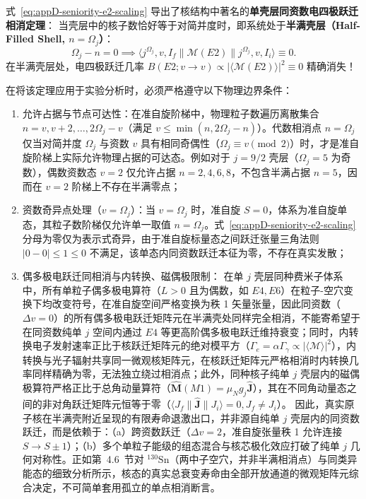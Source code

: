 式~\eqref{eq:appD-seniority-e2-scaling} 导出了核结构中著名的\textbf{单壳层同资数电四极跃迁相消定理}：
当壳层中的核子数恰好等于对简并度时，即系统处于\textbf{半满壳层（Half-Filled Shell, $n = \Omega_j$）}：
\begin{equation}\label{eq:appD-cancellation-theorem}
\Omega_j - n = 0 \implies \langle j^{\Omega_j}, v, I_f \| \mathcal{M}(E2) \| j^{\Omega_j}, v, I_i \rangle \equiv 0.
\end{equation}
在半满壳层处，电四极跃迁几率 $B(E2; v \to v) \propto |\langle \mathcal{M}(E2) \rangle|^2 \equiv 0$ 精确消失！

在将该定理应用于实验分析时，必须严格遵守以下物理边界条件：
\begin{enumerate}
\item 允许占据与节点可达性：在准自旋阶梯中，物理粒子数遍历离散集合 $n = v, v + 2, \dots, 2\Omega_j - v$（满足 $v \le \min(n, 2\Omega_j - n)$）。代数相消点 $n = \Omega_j$ 仅当对简并度 $\Omega_j$ 与资数 $v$ 具有相同奇偶性（$\Omega_j \equiv v \pmod 2$）时，才是准自旋阶梯上实际允许物理占据的可达态。例如对于 $j=9/2$ 壳层（$\Omega_j = 5$ 为奇数），偶数资数态 $v=2$ 仅允许占据 $n = 2, 4, 6, 8$，不包含半满占据 $n=5$，因而在 $v=2$ 阶梯上不存在半满零点；
\item 资数奇异点处理（$v = \Omega_j$）：当 $v = \Omega_j$ 时，准自旋 $S = 0$，体系为准自旋单态，其粒子数阶梯仅允许单一取值 $n = \Omega_j$。式~\eqref{eq:appD-seniority-e2-scaling} 分母为零仅为表示式奇异，由于准自旋标量态之间跃迁张量三角法则 $|0 - 0| \le 1 \le 0$ 不满足，该单态内同资数跃迁本征为零，不存在真实发散；
\item 偶多极电跃迁同相消与内转换、磁偶极限制：
在单 $j$ 壳层同种费米子体系中，所有单粒子偶多极电算符（$L > 0$ 且为偶数，如 $E4, E6$）在粒子-空穴变换下均改变符号，在准自旋空间严格变换为秩 1 矢量张量，因此同资数（$\Delta v = 0$）的所有偶多极电跃迁矩阵元在半满壳处同样完全相消，不能寄希望于在同资数纯单 $j$ 空间内通过 $E4$ 等更高阶偶多极电跃迁维持衰变；同时，内转换电子发射速率正比于核跃迁矩阵元的绝对模平方（$\Gamma_e = \alpha \Gamma_\gamma \propto |\langle \mathcal{M} \rangle|^2$），内转换与光子辐射共享同一微观核矩阵元，在核跃迁矩阵元严格相消时内转换几率同样精确为零，无法独立绕过相消点；此外，同种核子纯单 $j$ 壳层内的磁偶极算符严格正比于总角动量算符（$\hat{\mathbf{M}}(M1) = \mu_N g_j \hat{\mathbf{J}}$），其在不同角动量态之间的非对角跃迁矩阵元恒等于零（$\langle J_f \| \hat{\mathbf{J}} \| J_i \rangle = 0, J_f \ne J_i$）。
因此，真实原子核在半满壳附近呈现的有限寿命退激出口，并非源自纯单 $j$ 壳层内的同资数跃迁，而是依赖于：（a）跨资数跃迁（$\Delta v = 2$，准自旋张量秩 1 允许连接 $S \to S \pm 1$）；（b）多个单粒子能级的组态混合与核芯极化效应打破了纯单 $j$ 几何对称性。正如第~4.6~节对 $^{130}\mathrm{Sn}$（两中子空穴，并非半满相消点）与同类异能态的细致分析所示，核态的真实总衰变寿命由全部开放通道的微观矩阵元综合决定，不可简单套用孤立的单点相消断言。
\end{enumerate}

